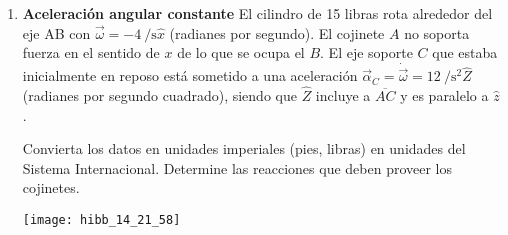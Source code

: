 \documentclass[11pt, spanish, a4paper, twoside]{article}
\begin{document}
\begin{enumerate}
\item 
\begin{minipage}[t][3.5cm]{0.65\textwidth}
		\textbf{Aceleración angular constante}
El cilindro de 15 libras rota alrededor del eje AB con \(\vec{\omega} = -\SI{4}{\per\second} \hat{x}\) (radianes por segundo).
El cojinete \(A\) no soporta fuerza en el sentido de \(x\) de lo que se ocupa el \(B\).
El eje soporte \(C\) que estaba inicialmente en reposo está sometido a una aceleración \(\vec{\alpha}_C = \dot{\vec{\omega}} = \SI{12}{\per\second\squared} \hat{Z}\) (radianes por segundo cuadrado), siendo que \(\hat{Z}\) incluye a \(\overline{AC}\) y es paralelo a \(\hat{z}\).
\begin{tasks}
	\task Convierta los datos en unidades imperiales (pies, libras) en unidades del Sistema Internacional.
	\task Determine las reacciones que deben proveer los cojinetes.
\end{tasks}
\end{minipage}
\begin{minipage}[c][2cm][t]{0.3\textwidth}
	\texttt{[image: hibb\_14\_21\_58]}
\end{minipage}


\end{enumerate}
\end{document}
